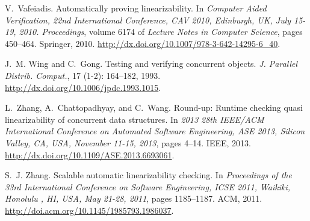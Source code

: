 \documentclass[9pt,natbib,authoryear]{sigplanconf}
\begin{document}
\begin{thebibliography}{26}
V.~Vafeiadis.
\newblock Automatically proving linearizability.
\newblock In \emph{Computer Aided Verification, 22nd International Conference,
  {CAV} 2010, Edinburgh, UK, July 15-19, 2010. Proceedings}, volume 6174 of
  \emph{Lecture Notes in Computer Science}, pages 450--464. Springer, 2010.
\newblock \url{http://dx.doi.org/10.1007/978-3-642-14295-6_40}.

J.~M. Wing and C.~Gong.
\newblock Testing and verifying concurrent objects.
\newblock \emph{J. Parallel Distrib. Comput.}, 17 (1-2):
  164--182, 1993.
\newblock \url{http://dx.doi.org/10.1006/jpdc.1993.1015}.

L.~Zhang, A.~Chattopadhyay, and C.~Wang.
\newblock Round-up: Runtime checking quasi linearizability of concurrent data
  structures.
\newblock In \emph{2013 28th {IEEE/ACM} International Conference on Automated
  Software Engineering, {ASE} 2013, Silicon Valley, CA, USA, November 11-15,
  2013}, pages 4--14. {IEEE}, 2013.
\newblock \url{http://dx.doi.org/10.1109/ASE.2013.6693061}.

S.~J. Zhang.
\newblock Scalable automatic linearizability checking.
\newblock In \emph{Proceedings of the 33rd International Conference on Software
  Engineering, {ICSE} 2011, Waikiki, Honolulu , HI, USA, May 21-28, 2011},
  pages 1185--1187. {ACM}, 2011.
\newblock \url{http://doi.acm.org/10.1145/1985793.1986037}.

\end{thebibliography}
\end{document}
